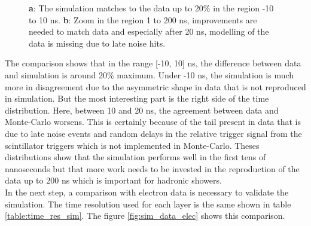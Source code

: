 \documentclass[twoside,a4paper,11pt]{article}
\begin{document}
\begin{figure}[htbp]
	\hfill
	\caption[]{\textbf{a}: The simulation matches to the data up to 20\% in the region -10 to 10 ns. \textbf{b}: Zoom in the region 1 to 200 ns, improvements are needed to match data and especially after 20 ns, modelling of the data is missing due to late noise hits.}
	\label{fig:sim_data_muon}
\end{figure}
The comparison shows that in the range [-10, 10] ns, the difference between data and simulation is around 20\% maximum. Under -10 ns, the simulation is much more in disagreement due to the asymmetric shape in data that is not reproduced in simulation. But the most interesting part is the right side of the time distribution. Here, between 10 and 20 ns, the agreement between data and Monte-Carlo worsens. This is certainly because of the tail present in data that is due to late noise events and random delays in the relative trigger signal from the scintillator triggers which is not implemented in Monte-Carlo. Theses distributions show that the simulation performs well in the first tens of nanoseconds but that more work needs to be invested in the reproduction of the data up to 200 ns which is important for hadronic showers.\\
In the next step, a comparison with electron data is necessary to validate the simulation. The time resolution used for each layer is the same shown in table \ref{table:time_res_sim}. The figure \ref{fig:sim_data_elec} shows this comparison.
\end{document}
